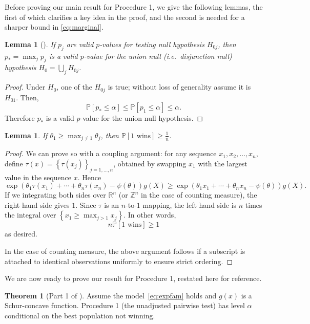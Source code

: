 \documentclass[11pt]{article}
\newtheorem{lemma}[corollary]{Lemma}
\theoremstyle{definition}
\theoremstyle{custom}
\newtheorem*{customthm}{Theorem}
\newcommand{\PP}{\mathbb{P}}
\begin{document}
Before proving our main result for Procedure 1, we give the following lemmas, the first of which clarifies a key idea in the proof, and the second is needed for a sharper bound in \eqref{eq:marginal}.

\begin{lemma}[\citealp{Berger:1982hy}]
If $p_j$ are valid $p$-values for testing null hypothesis $H_{0j}$, then $p_* = \max_j p_j$ is a valid $p$-value for the union null (i.e.\ disjunction null) hypothesis $H_0 = \bigcup_j H_{0j}$. \label{lma:union}
\end{lemma}

\begin{proof}
Under $H_0$, one of the $H_{0j}$ is true; without loss of generality assume it is $H_{01}$. Then,
\[\PP\left[p_* \le \alpha\right] \le \PP\left[p_1 \le \alpha\right] \le \alpha.\]
Therefore $p_*$ is a valid $p$-value for the union null hypothesis.
\end{proof}

\begin{lemma}
If $\theta_1 \ge \max_{j \ne 1} \theta_j$, then $\PP\left[1 \text{ wins}\right] \ge \frac{1}{n}$.
\label{lma:margsharp}
\end{lemma}

\begin{proof}
We can prove so with a coupling argument: for any sequence $x_1, x_2, \ldots, x_n$, define $\tau\left(x\right) = \left\{\tau\left(x_j\right)\right\}_{j = 1, \ldots, n}$, obtained by swapping $x_1$ with the largest value in the sequence $x$. Hence
\[\exp\left(\theta_1 \tau\left(x_1\right) + \cdots + \theta_n \tau\left(x_n\right) - \psi\left(\theta\right)\right) g\left(X\right) \ge \exp\left(\theta_1 x_1 + \cdots + \theta_n x_n - \psi\left(\theta\right)\right) g\left(X\right).\]
If we integrating both sides over $\mathbb{R}^n$ (or $\mathbb{Z}^n$ in the case of counting measure), the right hand side gives $1$. Since $\tau$ is an $n$-to-$1$ mapping, the left hand side is $n$ times the integral over $\left\{x_1 \ge \max_{j > 1} x_j\right\}$. In other words,
\[n \PP\left[1 \text{ wins}\right] \ge 1\]
as desired.

In the case of counting measure, the above argument follows if a subscript is attached to identical observations uniformly to ensure strict ordering.
\end{proof}

We are now ready to prove our result for Procedure 1, restated here for reference.

\begin{customthm}[Part 1 of ]
Assume the model~\eqref{eq:expfam} holds and $g\left(x\right)$ is a Schur-concave function. Procedure 1 (the unadjusted pairwise test) has level $\alpha$ conditional on the best population not winning.
\end{customthm}
\end{document}
